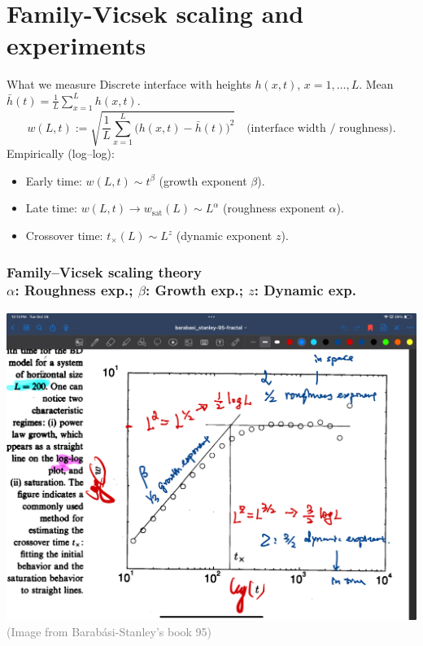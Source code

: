 \documentclass[9pt,table,xcolor=dvipsnames]{beamer}
\begin{document}
\section{Family-Vicsek scaling and experiments}

\begin{frame}[t]{What we measure}
  \small Discrete interface with heights $h(x,t)$, $x=1,\dots,L$. Mean $\bar
  h(t)=\frac1L\sum_{x=1}^L h(x,t)$.
  \[
    w(L,t)
    :=\sqrt{\frac1L\sum_{x=1}^L\big(h(x,t)-\bar h(t)\big)^2}
    \quad\text{(interface width / roughness)}.
  \]
  Empirically (log–log):
  \begin{itemize}\itemsep2pt
  \item Early time: $w(L,t)\sim t^{\beta}$ (growth exponent $\beta$).
  \item Late time: $w(L,t)\to w_{\mathrm{sat}}(L)\sim L^{\alpha}$ (roughness
    exponent $\alpha$).
  \item Crossover time: $t_\times(L)\sim L^{z}$ (dynamic exponent $z$).
\end{itemize}
\end{frame}
\begin{frame}[fragile,t] %
 \frametitle{Family--Vicsek scaling theory \\ 
 \small $\alpha$: Roughness exp.;  $\beta$: Growth exp.; $z$: Dynamic exp.}
  \begin{center}
    \includegraphics[width=0.9\linewidth]{./figs/log-log_Illistrutaion.jpg} \\

    \vfill{\footnotesize \textcolor{gray}{(Image from Barab\'asi-Stanley's book
    95)}}
  \end{center}
\end{frame}
\end{document}
